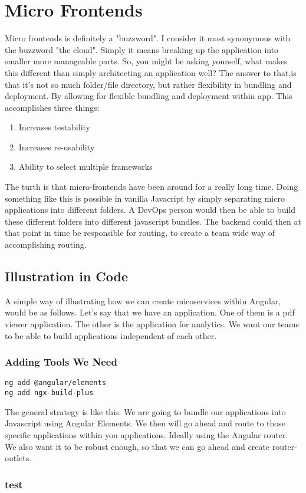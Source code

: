 \chapter{ Micro Frontends }
Micro frontends is definitely a "buzzword". I consider it most synonymous with the buzzword "the cloud". Simply it means breaking up the application into smaller more manageable parts. So, you might be asking yourself, what makes this different than simply architecting an application well? The answer to that,is that it's not so much folder/file directory, but rather flexibility in bundling and deployment. By allowing for flexible bundling and deployment within app. This accomplishes three things: 
\begin{enumerate}
  \item Increases testability
  \item Increases re-usability
  \item Ability to select multiple frameworks
\end{enumerate}

The turth is that micro-frontends have been around for a really long time. Doing something like this is possible in vanilla Javacript by simply separating micro applications into different folders. A DevOps person would then be able to build these different folders into different javascript bundles. The backend could then at that point in time be responsible for routing, to create a team wide way of accomplishing routing. 

\section{Illustration in Code}
A simple way of illustrating how we can create micoservices within Angular, would be as follows. Let's say that we have an application. One of them is a pdf viewer application. The other is the application for analytics. We want our teams to be able to build applications independent of each other. 

\subsection{Adding Tools We Need}
\begin{verbatim}
ng add @angular/elements
ng add ngx-build-plus
\end{verbatim}

The general strategy is like this. We are going to bundle our applications into Javascript using Angular Elements. We then will go ahead and route to those specific applications within you applications. Ideally using the Angular router. We also want it to be robust enough, so that we can go ahead and create router-outlets. 

\subsection{test}
